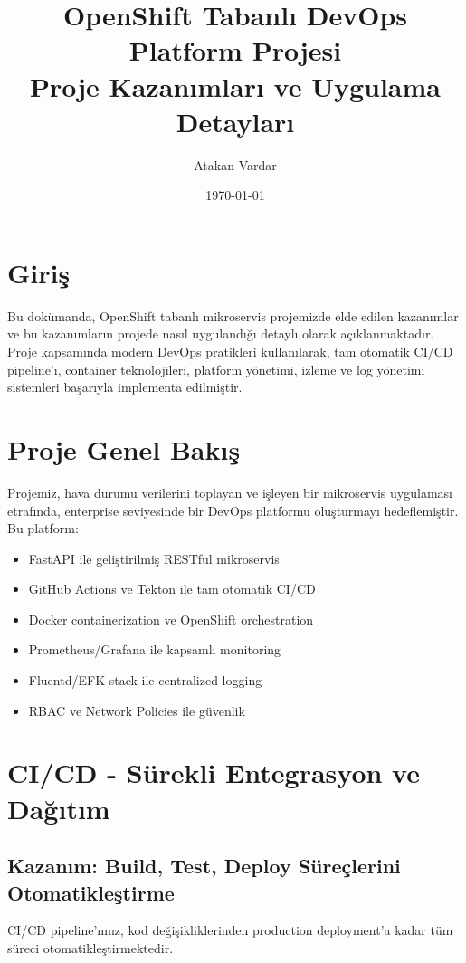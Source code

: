 \documentclass[12pt,a4paper]{article}
\title{\textbf{OpenShift Tabanlı DevOps Platform Projesi}\\
\Large Proje Kazanımları ve Uygulama Detayları}
\author{Atakan Vardar}
\date{\today}
\begin{document}
\maketitle
\tableofcontents
\newpage

\section{Giriş}

Bu dokümanda, OpenShift tabanlı mikroservis projemizde elde edilen kazanımlar ve bu kazanımların projede nasıl uygulandığı detaylı olarak açıklanmaktadır. Proje kapsamında modern DevOps pratikleri kullanılarak, tam otomatik CI/CD pipeline'ı, container teknolojileri, platform yönetimi, izleme ve log yönetimi sistemleri başarıyla implementa edilmiştir.

\section{Proje Genel Bakış}

Projemiz, hava durumu verilerini toplayan ve işleyen bir mikroservis uygulaması etrafında, enterprise seviyesinde bir DevOps platformu oluşturmayı hedeflemiştir. Bu platform:

\begin{itemize}
    \item FastAPI ile geliştirilmiş RESTful mikroservis
    \item GitHub Actions ve Tekton ile tam otomatik CI/CD
    \item Docker containerization ve OpenShift orchestration
    \item Prometheus/Grafana ile kapsamlı monitoring
    \item Fluentd/EFK stack ile centralized logging
    \item RBAC ve Network Policies ile güvenlik
\end{itemize}

\section{CI/CD - Sürekli Entegrasyon ve Dağıtım}

\subsection{Kazanım: Build, Test, Deploy Süreçlerini Otomatikleştirme}

CI/CD pipeline'ımız, kod değişikliklerinden production deployment'a kadar tüm süreci otomatikleştirmektedir.
\end{document}
